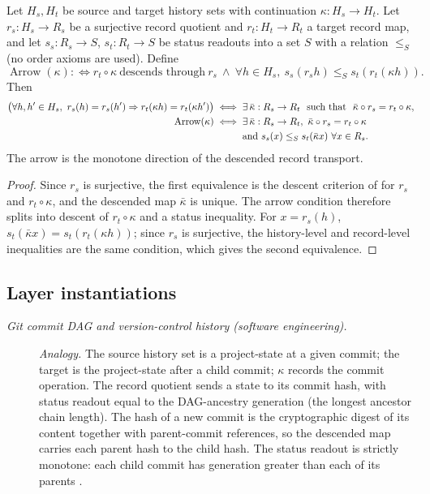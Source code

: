 \begin{theorem}\label{thm:F38}
Let \(H_s,H_t\) be source and target history sets with continuation
\(\kappa:H_s\to H_t\). Let \(r_s:H_s\to R_s\) be a surjective record quotient
and \(r_t:H_t\to R_t\) a target record map, and let
\(s_s:R_s\to S\), \(s_t:R_t\to S\) be status readouts into a set \(S\) with a relation \(\le_S\) (no order axioms are used). Define
\[
  \operatorname{Arrow}(\kappa)
  :\Longleftrightarrow
  r_t\circ\kappa\ \text{descends through}\ r_s
  \ \wedge\
  \forall h\in H_s,\ s_s(r_s h)\le_S s_t(r_t(\kappa h)).
\]
Then
\begin{align*}
  \bigl(\forall h,h'\in H_s,\ r_s(h)=r_s(h')\Rightarrow r_t(\kappa h)=r_t(\kappa h')\bigr)
  &\iff
  \exists\,\bar\kappa:R_s\to R_t\ \text{ such that }\
    \bar\kappa\circ r_s=r_t\circ\kappa,\\
  \operatorname{Arrow}(\kappa)
  &\iff
  \exists\,\bar\kappa:R_s\to R_t,\
  \bar\kappa\circ r_s=r_t\circ\kappa\\
  &\hphantom{{}\iff{}}\text{and } s_s(x)\le_S s_t(\bar\kappa x)\
    \forall x\in R_s.
\end{align*}
The arrow is the monotone direction of the descended record transport.
\end{theorem}
\begin{proof}
Since \(r_s\) is surjective, the first equivalence is the descent
criterion of \Cref{sec:apparatus} for \(r_s\) and \(r_t\circ\kappa\),
and the descended map \(\bar\kappa\) is unique.  The arrow condition
therefore splits into descent of \(r_t\circ\kappa\) and a status
inequality.  For \(x=r_s(h)\), \(s_t(\bar\kappa x)=s_t(r_t(\kappa h))\); since \(r_s\) is
surjective, the history-level and record-level inequalities are the same
condition, which gives the second equivalence.
\end{proof}

\subsection*{Layer instantiations}\label{layer-inst:F38}

\begingroup\small
\begin{description}
\item[\emph{Git commit {DAG} and version-control history
(software engineering).}] \textit{Analogy.}
The source history set is a project-state at a given
commit; the target is the project-state after a child
commit; \(\kappa\) records the commit operation.  The
record quotient sends a state to its commit hash, with
status readout equal to the DAG-ancestry generation
(the longest ancestor chain length).  The hash of a
new commit is the cryptographic digest of its content
together with parent-commit references, so the
descended map carries each parent hash to the child
hash.  The status readout is strictly monotone: each
child commit has generation greater than each of its
parents \citep{ChaconStraub2014ProGit}.

\end{description}
\endgroup


